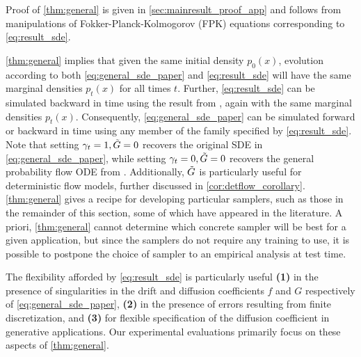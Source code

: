 Proof of \cref{thm:general} is given in \cref{sec:mainresult_proof_app} and follows from manipulations of Fokker-Planck-Kolmogorov (FPK) equations corresponding to \cref{eq:result_sde}.

\cref{thm:general} implies that given the same initial density $p_0(x)$, evolution according to both \cref{eq:general_sde_paper} and \cref{eq:result_sde} will have the same marginal densities $p_t(x)$ for all times $t$.
Further, \cref{eq:result_sde} can be simulated backward in time using the result from \citet{anderson1982reverse}, again with the same marginal densities $p_t(x)$.
Consequently, \cref{eq:general_sde_paper} can be simulated forward or backward in time using any member of the family specified by \cref{eq:result_sde}.
Note that setting $\gamma_t=1, \tilde G = 0$ recovers the original SDE in \cref{eq:general_sde_paper}, while setting $\gamma_t=0,\tilde G = 0$ recovers the general probability flow ODE from \citet[eq. 37]{song2020score}.
Additionally, $\tilde G$ is particularly useful for deterministic flow models, further discussed in \cref{cor:detflow_corollary}.
\cref{thm:general} gives a recipe for developing particular samplers, such as those in the remainder of this section, some of which have appeared in the literature.
A priori, \cref{thm:general} cannot determine which concrete sampler will be best for a given application, but since the samplers do not require any training to use, it is possible to postpone the choice of sampler to an empirical analysis at test time.

The flexibility afforded by \cref{eq:result_sde} is particularly useful
\textbf{(1)} in the presence of singularities in the drift and diffusion coefficients $f$ and $G$ respectively of \cref{eq:general_sde_paper},
\textbf{(2)} in the presence of errors resulting from finite discretization,
and \textbf{(3)} for flexible specification of the diffusion coefficient in generative applications.
Our experimental evaluations primarily focus on these aspects of \cref{thm:general}.

